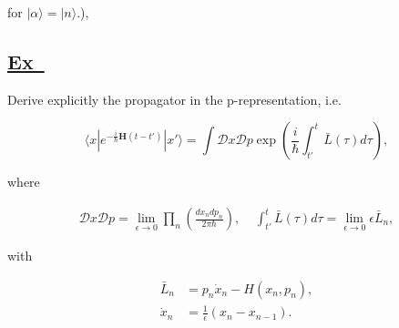 \documentclass[a4paper,12pt]{article}
\newcommand{\excercise}{\addtocounter{section}{+1}
\subsection*{\underline{Ex~\thesection}}}
\newcommand{\bra}[1]{\langle#1|}
\newcommand{\ket}[1]{|#1\rangle }
\begin{document}
\noindent for $ \ket{\alpha}=\ket{n} $.),

\excercise 

Derive explicitly the propagator in the p-representation, i.e.
 
$$
\bra{x}e^{-\frac{i}{\hbar}\mathbf{H}(t-t')}\ket{x'}=\int\mathcal{D}x\mathcal{D}p
\exp\left(\frac{i}{\hbar}\int_{t'}^t\bar{L}(\tau)d\tau\right),		
$$

\noindent where                        

\begin{align*}
\mathcal{D}x\mathcal{D}p=\lim_{\epsilon\rightarrow 0}\prod_n\left(\frac{dx_ndp_n}{2\pi\hbar}\right),~~~~~\int_{t'}^{t}\bar{L}(\tau)d\tau=\lim_{\epsilon\rightarrow 0}\epsilon\bar{L}_n,
\end{align*}

\noindent with

\begin{align*}
\bar{L}_n&=p_n\dot{x}_n-H(x_n,p_n),\\
\dot{x}_n&=\frac{1}{\epsilon}(x_n-x_{n-1}).
\end{align*}
\end{document}
